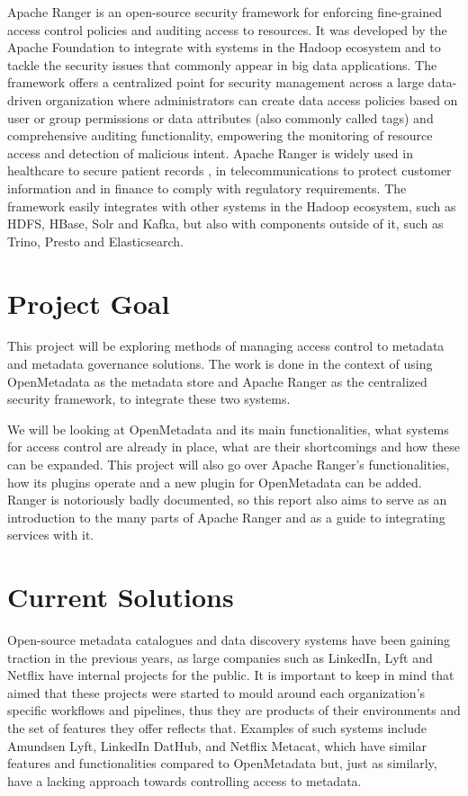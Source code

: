 Apache Ranger \cite{apacheRangerAccessControlModelGuptaMaanak2017,apacheRangerMultiLayerdGuptaMaanak2017} is an open-source security framework for enforcing fine-grained access control policies and auditing access to resources. It was developed by the Apache Foundation to integrate with systems in the Hadoop ecosystem and to tackle the security issues that commonly appear in big data applications. The framework offers a centralized point for security management across a large data-driven organization where administrators can create data access policies based on user or group permissions or data attributes (also commonly called tags) and comprehensive auditing functionality, empowering the monitoring of resource access and detection of malicious intent. Apache Ranger is widely used in healthcare 
to secure patient records \cite{rangerHealhcareRangarajan2018}, in telecommunications to protect customer information \cite{rangerTelecomAhmad2019} and in finance to comply with regulatory requirements. The framework easily integrates with other systems in the Hadoop ecosystem, such as HDFS, HBase, Solr and Kafka, but also with components outside of it, such as Trino, Presto and Elasticsearch.

\section{\label{sec:project_goal} Project Goal}

This project will be exploring methods of managing access control to metadata and metadata governance solutions. The work is done in the context of using OpenMetadata as the metadata store and Apache Ranger as the centralized security framework, to integrate these two systems.

We will be looking at OpenMetadata and its main functionalities, what systems for access control are already in place, what are their shortcomings and how these can be expanded. This project will also go over Apache Ranger's functionalities, how its plugins operate and a new plugin for OpenMetadata can be added. Ranger is notoriously badly documented, so this report also aims to serve as an introduction to the many parts of Apache Ranger and as a guide to integrating services with it.

\section{Current Solutions}

Open-source metadata catalogues and data discovery systems have been gaining traction in the previous years, as large companies such as LinkedIn, Lyft and Netflix have internal projects for the public. It is important to keep in mind that aimed that these projects were started to mould around each organization's specific workflows and pipelines, thus they are products of their environments and the set of features they offer reflects that. Examples of such systems include Amundsen Lyft, LinkedIn DatHub, and Netflix Metacat, which have similar features and functionalities compared to OpenMetadata but, just as similarly, have a lacking approach towards controlling access to metadata.

